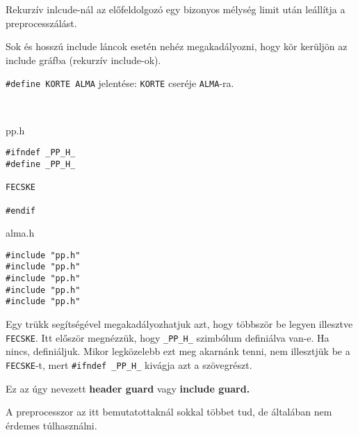 \documentclass[a4paper,11.5pt]{article}
\begin{document}
	Rekurzív inlcude-nál az előfeldolgozó egy bizonyos mélység limit után leállítja a preprocesszálást.
	
  Sok és hosszú include láncok esetén nehéz megakadályozni, hogy kör kerüljön az include gráfba (rekurzív include-ok).
	\begin{note}
		\texttt{\#define KORTE ALMA} jelentése: \texttt{KORTE} cseréje \texttt{ALMA}-ra.
	\end{note}
	\begin{example}\ 
		
		pp.h
		\begin{lstlisting}
#ifndef _PP_H_
#define _PP_H_

FECSKE

#endif
		\end{lstlisting}
		
		alma.h
		\begin{lstlisting}
#include "pp.h"
#include "pp.h"
#include "pp.h"
#include "pp.h"
#include "pp.h"
		\end{lstlisting}
	\end{example}
	
	Egy trükk segítségével megakadályozhatjuk azt, hogy többször be legyen illesztve \texttt{FECSKE}. Itt először megnézzük, hogy \texttt{\_PP\_H\_} szimbólum definiálva van-e. Ha nincs, definiáljuk. Mikor legközelebb ezt meg akarnánk tenni, nem illesztjük be a \texttt{FECSKE}-t, mert \texttt{\#ifndef \_PP\_H\_} kivágja azt a szövegrészt.
	
  Ez az úgy nevezett \textbf{header guard} vagy \textbf{include guard.}
	
	\medskip
	A preprocesszor az itt bemutatottaknál sokkal többet tud, de általában nem érdemes túlhasználni.
\end{document}
